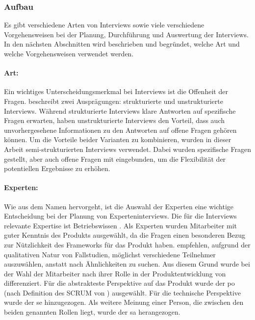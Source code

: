 \subsubsection{Aufbau}
Es gibt verschiedene Arten von Interviews sowie viele verschiedene Vorgehensweisen bei der Planung, Durchführung und Auswertung der Interviews.
In den nächsten Abschnitten wird beschrieben und begründet, welche Art und welche Vorgehensweisen verwendet werden.

\paragraph{Art:} Ein wichtiges Unterscheidungsmerkmal bei Interviews ist die Offenheit der Fragen.
 beschreibt zwei Ausprägungen: strukturierte und unstrukturierte Interviews.
Während struk\-tu\-rier\-te Interviews klare Antworten auf spezifische Fragen erwarten, haben unstrukturierte Interviews den Vorteil, dass auch unvorhergesehene Informationen zu den Antworten auf offene Fragen gehören können.
Um die Vorteile beider Varianten zu kombinieren, wurden in dieser Arbeit semi-strukturierten Interviews \cite{seaman2008qualitative} verwendet.
Dabei wurden spezifische Fragen gestellt, aber auch offene Fragen mit eingebunden, um die Flexibilität der potentiellen Ergebnisse zu erhöhen.

\paragraph{Experten:} Wie aus dem Namen hervorgeht, ist die Auswahl der Experten eine wichtige Entscheidung bei der Planung von Experteninterviews.
Die für die Interviews relevante Expertise ist \glqq Betriebswissen\grqq{} \cite{Meuser2009}.
Als Experten wurden Mitarbeiter mit guter Kenntnis des Produkts \jf ausgewählt, da die Fragen einen besonderen Bezug zur Nützlichkeit des Frameworks für das Produkt haben.
 empfehlen, aufgrund der qualitativen Natur von Fallstudien, möglichst verschiedene Teilnehmer auszuwählen, anstatt nach Ähnlichkeiten zu suchen.
Aus diesem Grund wurde bei der Wahl der Mitarbeiter nach ihrer Rolle in der Produktentwicklung von \jf differenziert.
Für die abstrakteste Perspektive auf das Produkt wurde der \acrlong{po} (nach Definition des SCRUM von ) ausgewählt.
Für die technische Perspektive wurde der \gls{se} hinzugezogen.
Als weitere Meinung einer Person, die zwischen den beiden genannten Rollen liegt, wurde der \gls{sa} herangezogen.

